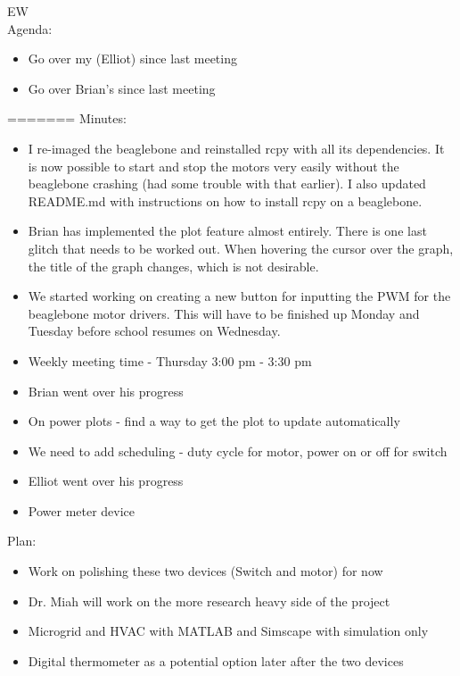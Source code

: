 \documentclass[fontsize=11pt, %
                             paper=letter, %
                             openany, %
                             captions=tableheading,
                             index=totoc,
                             hyperref]{labbook}
\begin{document}
EW\\
Agenda:
\begin{itemize}
\item Go over my (Elliot) since last meeting
\item Go over Brian's since last meeting
\end{itemize}
=======
Minutes:
\begin{itemize}
\item I re-imaged the beaglebone and reinstalled rcpy with all its dependencies. It is now possible to start and stop the motors very easily without the beaglebone crashing (had some trouble with that earlier). I also updated README.md with instructions on how to install rcpy on a beaglebone.
\item Brian has implemented the plot feature almost entirely. There is one last glitch that needs to be worked out. When hovering the cursor over the graph, the title of the graph changes, which is not desirable.
\item We started working on creating a new button for inputting the PWM for the beaglebone motor drivers. This will have to be finished up Monday and Tuesday before school resumes on Wednesday.
\end{itemize}

\begin{itemize}
\item Weekly meeting time - Thursday 3:00 pm - 3:30 pm
\item Brian went over his progress
\item On power plots - find a way to get the plot to update automatically
\item We need to add scheduling - duty cycle for motor, power on or off for switch
\item Elliot went over his progress
\item Power meter device 
\end{itemize}
Plan:
\begin{itemize}
\item Work on polishing these two devices (Switch and motor) for now
\item Dr. Miah will work on the more research heavy side of the project
\item Microgrid and HVAC with MATLAB and Simscape with simulation only
\item Digital thermometer as a potential option later after the two devices
\end{itemize}
\end{document}
